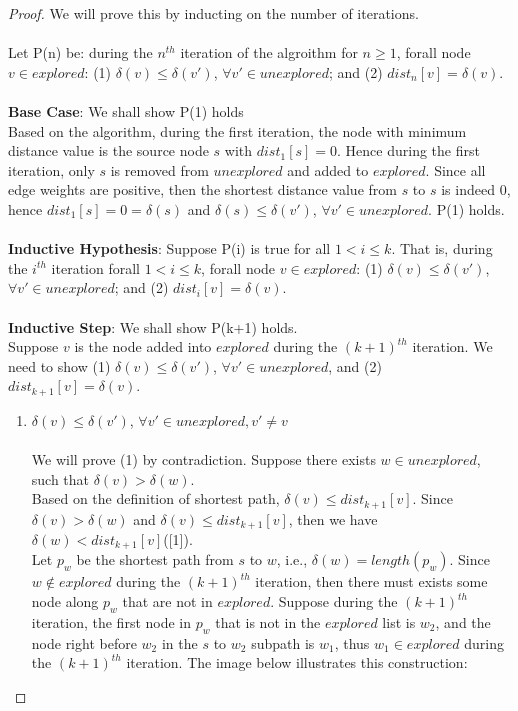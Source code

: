 \documentclass[11pt, oneside]{article}   	%
\newcommand\tab[1][1cm]{\hspace*{#1}}
\theoremstyle{definition}
\begin{document}
\begin{proof}
We will prove this by inducting on the number of iterations. 
\\\\
Let P(n) be: during the $n^{th}$ iteration of the algroithm for $n \geq 1$, forall node $v \in explored$: (1) $\delta(v) \leq \delta(v')$, $\forall v' \in unexplored$; and (2) $dist_n[v] = \delta(v)$. 
\tab\\\\
\textbf{Base Case}: We shall show P(1) holds \\
Based on the algorithm, during the first iteration, the node with minimum distance value is the source node $s$ with $dist_1[s] = 0$. Hence during the first iteration, only $s$ is removed from $unexplored$ and added to $explored$. Since all edge weights are positive, then the shortest distance value from $s$ to $s$ is indeed $0$, hence $dist_1[s] = 0 = \delta(s)$ and $\delta(s) \leq \delta(v')$, $\forall v' \in unexplored$. P(1) holds.
\\\\
\textbf{Inductive Hypothesis}: Suppose P(i) is true for all $1 < i \leq k$. That is, during the $i^{th}$ iteration forall $1 < i \leq k$, forall node $v \in explored$: (1) $\delta(v) \leq \delta(v')$, $\forall v' \in unexplored$; and (2) $dist_i[v] = \delta(v)$. 
\\\\
\textbf{Inductive Step}: We shall show P(k+1) holds.
\\
Suppose $v$ is the node added into $explored$ during the $(k+1)^{th}$ iteration. We need to show (1) $\delta(v) \leq \delta(v')$, $\forall v' \in unexplored$, and (2) $dist_{k+1}[v] = \delta(v)$. 
\begin{enumerate}
\item $\delta(v) \leq \delta(v')$, $\forall v' \in unexplored, v' \neq v$
\\\\
We will prove (1) by contradiction. Suppose there exists $w \in unexplored$, such that $\delta(v) > \delta(w)$. 
\\
Based on the definition of shortest path, $\delta(v) \leq dist_{k+1}[v]$. Since $\delta(v) > \delta(w)$ and $\delta(v) \leq dist_{k+1}[v]$, then we have $\delta(w) < dist_{k+1}[v]$([1]). 
\\
Let $p_w$ be the shortest path from $s$ to $w$, i.e., $\delta(w) = length(p_w)$. Since $w \notin explored$ during the $(k+1)^{th}$ iteration, then there must exists some node along $p_w$ that are not in $explored$. Suppose during the $(k+1)^{th}$ iteration, the first node in $p_w$ that is not in the $explored$ list is $w_2$, and the node right before $w_2$ in the $s$ to $w_2$ subpath is $w_1$, thus $w_1 \in explored$ during the $(k+1)^{th}$ iteration. The image below illustrates this construction: 

\end{enumerate}
\end{proof}
\end{document}
